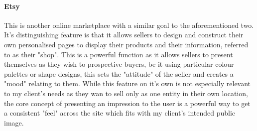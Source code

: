 ﻿\documentclass{article}
\begin{document}
    \paragraph{Etsy}
    This is another online marketplace with a similar goal to the aforementioned two.
    It's distinguishing feature is that it allows sellers to design and construct their own personalised pages to display their products and their information, referred to as their "shop".
    This is a powerful function as it allows sellers to present themselves as they wish to prospective buyers, be it using particular colour palettes or shape designs, this sets the "attitude" of the seller and creates a "mood" relating to them.
    While this feature on it's own is not especially relevant to my client's needs as they wan to sell only as one entity in their own location, the core concept of presenting an impression to the user is a powerful way to get a consistent "feel" across the site which fits with my client's intended public image.
\end{document}
